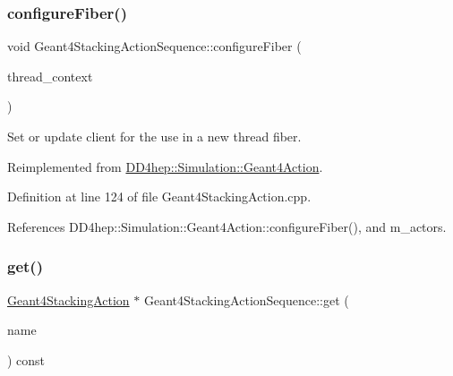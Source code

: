 \subsubsection{\texorpdfstring{configure\+Fiber()}{configureFiber()}}
{\footnotesize\ttfamily void Geant4\+Stacking\+Action\+Sequence\+::configure\+Fiber (\begin{DoxyParamCaption}\item[{\hyperlink{class_d_d4hep_1_1_simulation_1_1_geant4_context}{Geant4\+Context} $\ast$}]{thread\+\_\+context }\end{DoxyParamCaption})\hspace{0.3cm}{\ttfamily [virtual]}}



Set or update client for the use in a new thread fiber. 



Reimplemented from \hyperlink{class_d_d4hep_1_1_simulation_1_1_geant4_action_a6adc7138508303e4e417cb48a737ab19}{D\+D4hep\+::\+Simulation\+::\+Geant4\+Action}.



Definition at line 124 of file Geant4\+Stacking\+Action.\+cpp.



References D\+D4hep\+::\+Simulation\+::\+Geant4\+Action\+::configure\+Fiber(), and m\+\_\+actors.

\hypertarget{class_d_d4hep_1_1_simulation_1_1_geant4_stacking_action_sequence_afdb4f97bef2944e720a1313c66dab393}{}\label{class_d_d4hep_1_1_simulation_1_1_geant4_stacking_action_sequence_afdb4f97bef2944e720a1313c66dab393} 
\subsubsection{\texorpdfstring{get()}{get()}}
{\footnotesize\ttfamily \hyperlink{class_d_d4hep_1_1_simulation_1_1_geant4_stacking_action}{Geant4\+Stacking\+Action} $\ast$ Geant4\+Stacking\+Action\+Sequence\+::get (\begin{DoxyParamCaption}\item[{const std\+::string \&}]{name }\end{DoxyParamCaption}) const}



